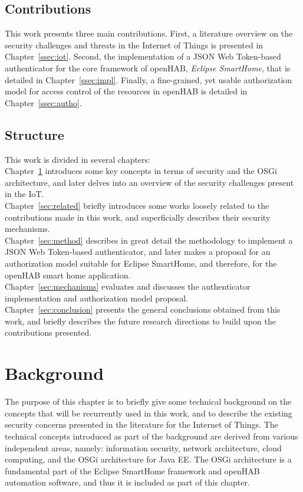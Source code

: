 \documentclass[12pt]{article}
\begin{document}
\subsection{Contributions}

This work presents three main contributions. First, a literature overview on the security challenges and threats in the Internet of Things is presented in Chapter~\ref{ssec:iot}. Second, the implementation of a JSON Web Token-based authenticator for the core framework of openHAB, \emph{Eclipse SmartHome}, that is detailed in Chapter~\ref{ssec:impl}. Finally, a fine-grained, yet usable authorization model for access control of the resources in openHAB is detailed in Chapter~\ref{ssec:autho}.

\subsection{Structure}

This work is divided in several chapters:\\
Chapter~\ref{sec:art} introduces some key concepts in terms of security and the OSGi architecture, and later delves into an overview of the security challenges present in the IoT. \\
Chapter~\ref{sec:related} briefly introduces some works loosely related to the contributions made in this work, and superficially describes their security mechanisms.\\
Chapter~\ref{sec:method} describes in great detail the methodology to implement a JSON Web Token-based authenticator, and later makes a proposal for an authorization model suitable for Eclipse SmartHome, and therefore, for the openHAB smart home application. \\
Chapter~\ref{sec:mechanisms} evaluates and discusses the authenticator implementation and authorization model proposal.\\
Chapter~\ref{sec:conclusion} presents the general conclusions obtained from this work, and briefly describes the future research directions to build upon the contributions presented.


\newpage
\section{Background} 
\label{sec:art}
The purpose of this chapter is to briefly give some technical background on the concepts that will be recurrently used in this work, and to describe the existing security concerns presented in the literature for the Internet of Things. The technical concepts introduced as part of the background are derived from various independent areas, namely: information security, network architecture, cloud computing, and the OSGi architecture for Java EE. The OSGi architecture is a fundamental part of the Eclipse SmartHome framework and openHAB automation software, and thus it is included as part of this chapter.
\end{document}

